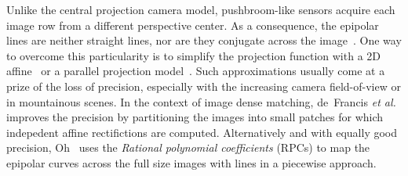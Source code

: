 \documentclass{ipol}
\begin{document}


 



  
%
Unlike the central projection camera model, pushbroom-like sensors acquire each image row from a different perspective center. As a consequence, the epipolar lines are neither straight lines, nor are they conjugate across the image~\cite{Gupta1997}.  One way to overcome this particularity is to simplify the projection function with a 2D affine~\cite{ono1999epipolar,wang2011epipolar} or a parallel projection model~\cite{morgan2006epipolar}. Such approximations usually come at a prize of the loss of precision, especially with the increasing camera field-of-view or in mountainous scenes. In the context of image dense matching, de~Francis \textit{et al.}~\cite{deFrancis2014stereo} improves the precision by partitioning the images into small patches for which indepedent affine rectifictions are computed. Alternatively and with equally good precision, Oh~\cite{Oh2011} uses the \textit{Rational polynomial coefficients} (RPCs) to map the epipolar curves across the full size images with lines in a piecewise approach.
%


\end{document}
